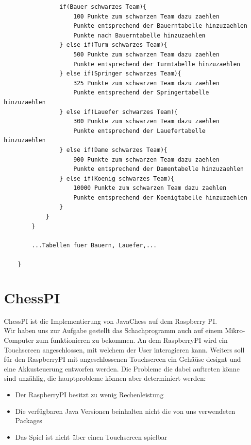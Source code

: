 \documentclass[12pt,a4paper]{article}
\begin{document}
{\begin{lstlisting}
				if(Bauer schwarzes Team){
					100 Punkte zum schwarzen Team dazu zaehlen
					Punkte entsprechend der Bauerntabelle hinzuzaehlen
					Punkte nach Bauerntabelle hinzuzaehlen
				} else if(Turm schwarzes Team){
					500 Punkte zum schwarzen Team dazu zaehlen
					Punkte entsprechend der Turmtabelle hinzuzaehlen
				} else if(Springer schwarzes Team){
					325 Punkte zum schwarzen Team dazu zaehlen
					Punkte entsprechend der Springertabelle hinzuzaehlen
				} else if(Lauefer schwarzes Team){
					300 Punkte zum schwarzen Team dazu zaehlen
					Punkte entsprechend der Lauefertabelle hinzuzaehlen
				} else if(Dame schwarzes Team){
					900 Punkte zum schwarzen Team dazu zaehlen
					Punkte entsprechend der Damentabelle hinzuzaehlen
				} else if(Koenig schwarzes Team){
					10000 Punkte zum schwarzen Team dazu zaehlen
					Punkte entsprechend der Koenigtabelle hinzuzaehlen
				}
			}
		}
		
		...Tabellen fuer Bauern, Lauefer,...		
		
	}	
\end{lstlisting}

\clearpage\vfill\newpage{}
\section{ChessPI}
\label{SEC:chesspi}

ChessPI ist die Implementierung von JavaChess auf dem Raspberry PI. \\
Wir haben uns zur Aufgabe gestellt das Schachprogramm auch auf einem Mikro-Computer zum funktionieren zu bekommen. An dem RaspberryPI wird ein Touchscreen angeschlossen, mit welchem der User interagieren kann. Weiters soll für den RaspberryPI mit angeschlossenen Touchscreen ein Gehäüse designt und eine Akkusteuerung entworfen werden. 
Die Probleme die dabei auftreten könne sind unzählig, die hauptprobleme können aber determiniert werden:
\begin{itemize}
	\item{Der RaspberryPI besitzt zu wenig Rechenleistung}
	\item{Die verfügbaren Java Versionen beinhalten nicht die von uns verwendeten Packages}
	\item{Das Spiel ist nicht über einen Touchscreen spielbar}
\end{itemize}

}
\end{document}
